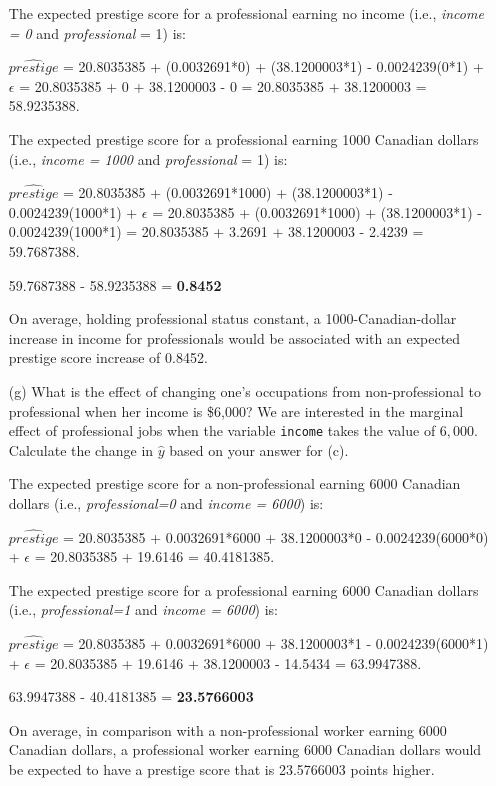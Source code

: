 \documentclass[12pt,letterpaper]{article}
\begin{document}
\begin{enumerate}
	The expected prestige score for a professional earning no income (i.e., \textit{income = 0} and \textit{professional} = 1) is:
	
	$\hat{prestige}$ = 20.8035385 + (0.0032691*0) + (38.1200003*1) - 0.0024239(0*1) + $\epsilon$
	= 20.8035385 + 0 + 38.1200003 - 0
	= 20.8035385 + 38.1200003 
	= 58.9235388.  \vspace{.5cm}	
	
	The expected prestige score for a professional earning 1000 Canadian dollars (i.e., \textit{income = 1000} and \textit{professional} = 1) is:
	
	$\hat{prestige}$ = 20.8035385 + (0.0032691*1000) + (38.1200003*1) - 0.0024239(1000*1) + $\epsilon$
	= 20.8035385 + (0.0032691*1000) + (38.1200003*1) - 0.0024239(1000*1) 
	= 20.8035385 + 3.2691 + 38.1200003 - 2.4239
	= 59.7687388. \vspace{.5cm}	
	
	59.7687388 - 58.9235388 = \textbf{0.8452}
	
	On average, holding professional status constant, a 1000-Canadian-dollar increase in income for professionals would be associated with an expected prestige score increase of 0.8452.
	
	\vspace{11cm}
	
	
	\item [(g)]
	What is the effect of changing one's occupations from non-professional to professional when her income is \$6,000? We are interested in the marginal effect of professional jobs when the variable \texttt{income} takes the value of $6,000$. Calculate the change in $\hat{y}$ based on your answer for (c). \vspace{1cm}
	
	The expected prestige score for a non-professional earning 6000 Canadian dollars (i.e., \textit{professional=0} and \textit{income = 6000}) is:
	
		$\hat{prestige}$ = 20.8035385 + 0.0032691*6000 + 38.1200003*0 - 0.0024239(6000*0) + $\epsilon$
		= 20.8035385 + 19.6146
		= 40.4181385. \vspace{.5cm}
		
	The expected prestige score for a professional earning 6000 Canadian dollars (i.e., \textit{professional=1} and \textit{income = 6000}) is:
	
	$\hat{prestige}$ = 20.8035385 + 0.0032691*6000 + 38.1200003*1 - 0.0024239(6000*1) + $\epsilon$
	= 20.8035385 + 19.6146 + 38.1200003 - 14.5434
	= 63.9947388. \vspace{.5cm}
	
	63.9947388 - 40.4181385 = \textbf{23.5766003}
	
	On average, in comparison with a non-professional worker earning 6000 Canadian dollars, a professional worker earning 6000 Canadian dollars would be expected to have a prestige score that is 23.5766003 points higher. 
	
\end{enumerate}
\end{document}
